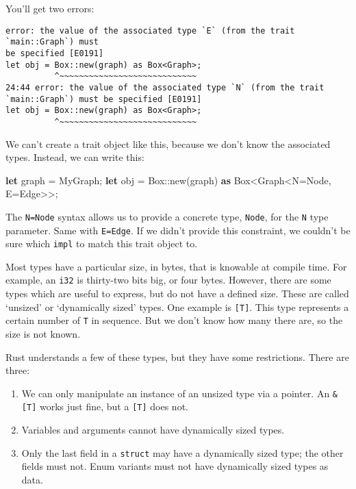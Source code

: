 \documentclass[a4paper,]{book}
\newenvironment{Shaded}{\begin{snugshade}}{\end{snugshade}}
\newcommand{\KeywordTok}[1]{\textcolor[rgb]{0.13,0.29,0.53}{\textbf{{#1}}}}
\newcommand{\DataTypeTok}[1]{\textcolor[rgb]{0.13,0.29,0.53}{{#1}}}
\newcommand{\NormalTok}[1]{{#1}}
\providecommand{\tightlist}{%
  \setlength{\itemsep}{0pt}\setlength{\parskip}{0pt}}
\begin{document}
You'll get two errors:

\begin{verbatim}
error: the value of the associated type `E` (from the trait `main::Graph`) must
be specified [E0191]
let obj = Box::new(graph) as Box<Graph>;
          ^~~~~~~~~~~~~~~~~~~~~~~~~~~~~
24:44 error: the value of the associated type `N` (from the trait
`main::Graph`) must be specified [E0191]
let obj = Box::new(graph) as Box<Graph>;
          ^~~~~~~~~~~~~~~~~~~~~~~~~~~~~
\end{verbatim}

We can't create a trait object like this, because we don't know the
associated types. Instead, we can write this:

\begin{Shaded}
\begin{Highlighting}[]
\KeywordTok{let} \NormalTok{graph = MyGraph;}
\KeywordTok{let} \NormalTok{obj = }\DataTypeTok{Box}\NormalTok{::new(graph) }\KeywordTok{as} \DataTypeTok{Box}\NormalTok{<Graph<N=Node, E=Edge>>;}
\end{Highlighting}
\end{Shaded}

The \texttt{N=Node} syntax allows us to provide a concrete type,
\texttt{Node}, for the \texttt{N} type parameter. Same with
\texttt{E=Edge}. If we didn't provide this constraint, we couldn't be
sure which \texttt{impl} to match this trait object to.


Most types have a particular size, in bytes, that is knowable at compile
time. For example, an \texttt{i32} is thirty-two bits big, or four
bytes. However, there are some types which are useful to express, but do
not have a defined size. These are called `unsized' or `dynamically
sized' types. One example is \texttt{{[}T{]}}. This type represents a
certain number of \texttt{T} in sequence. But we don't know how many
there are, so the size is not known.

Rust understands a few of these types, but they have some restrictions.
There are three:

\begin{enumerate}
\def\labelenumi{\arabic{enumi}.}
\tightlist
\item
  We can only manipulate an instance of an unsized type via a pointer.
  An \texttt{\&{[}T{]}} works just fine, but a \texttt{{[}T{]}} does
  not.
\item
  Variables and arguments cannot have dynamically sized types.
\item
  Only the last field in a \texttt{struct} may have a dynamically sized
  type; the other fields must not. Enum variants must not have
  dynamically sized types as data.
\end{enumerate}
\end{document}
